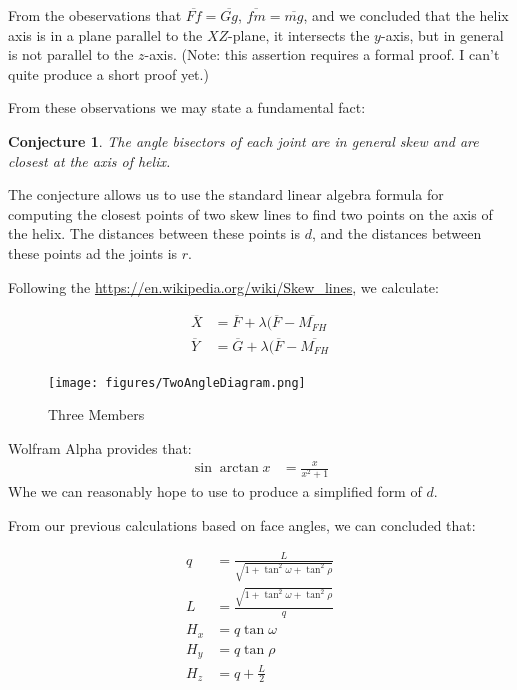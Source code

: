 \documentclass[11pt]{article}
\newtheorem{conjecture}{Conjecture}
\begin{document}
From the obeservations that $\overline{Ff} = \overline{Gg}$,
$\overline{fm} = \overline{mg} $, and
 we concluded that the helix axis is in a plane
parallel to the $XZ$-plane, it intersects the $y$-axis, but in general is
not parallel to the $z$-axis. (Note: this assertion requires a formal proof. I can't quite produce a short proof yet.)

From these observations we may state a fundamental fact:

\begin{conjecture}
  The angle bisectors of each joint are in general skew and are closest
  at the axis of helix.
\end{conjecture}

The conjecture allows us to use the standard linear algebra formula for
computing the closest points of two skew lines to find two points on the
axis of the helix. The distances between these points is $d$, and the
distances between these points ad the joints is $r$.

Following the \url{https://en.wikipedia.org/wiki/Skew_lines}, we calculate:

\begin{align}
  \overline{X} &= \overline{F} + \lambda(\overline{F} - \overline{M_{FH}} \\
  \overline{Y} &= \overline{G} + \lambda(\overline{F} - \overline{M_{FH}}  
\end{align}

\begin{figure}
     \centering
     \texttt{[image: figures/TwoAngleDiagram.png]}
     \caption{Three Members}
  \label{fig:threemembersdiagram}
\end{figure}

Wolfram Alpha provides that:
\begin{align}
  \sin{\arctan{x}} &= \frac{x}{x^2 + 1}
\end{align}
Whe we can reasonably hope to use to produce a simplified form of
$d$.

From our previous calculations based on face angles, we can
concluded that:

\begin{align}
  q &= \frac{L}{\sqrt{1 + \tan^2{\omega} + \tan^2{\rho}}}  \\
  L &= \frac{\sqrt{1 + \tan^2{\omega} + \tan^2{\rho}}}{q}  \\  
  H_x &= q \tan{\omega} \\
  H_y &= q \tan{\rho} \\
  H_z &= q + \frac{L}{2}
\end{align}
\end{document}
